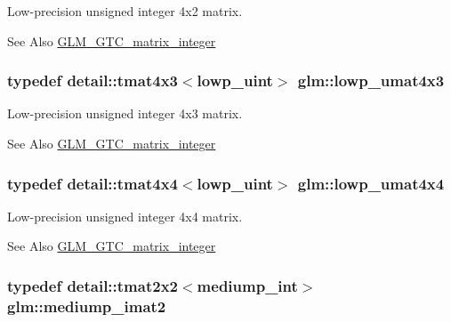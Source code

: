Low-\/precision unsigned integer 4x2 matrix. 

\begin{DoxySeeAlso}{See Also}
\hyperlink{group__gtc__matrix__integer}{G\-L\-M\-\_\-\-G\-T\-C\-\_\-matrix\-\_\-integer} 
\end{DoxySeeAlso}
\hypertarget{group__gtc__matrix__integer_ga37c5f105dd98823c07c39710f57260fe}{
\subsubsection[{lowp\-\_\-umat4x3}]{\setlength{\rightskip}{0pt plus 5cm}typedef detail\-::tmat4x3$<$lowp\-\_\-uint$>$ {\bf glm\-::lowp\-\_\-umat4x3}}}\label{group__gtc__matrix__integer_ga37c5f105dd98823c07c39710f57260fe}


Low-\/precision unsigned integer 4x3 matrix. 

\begin{DoxySeeAlso}{See Also}
\hyperlink{group__gtc__matrix__integer}{G\-L\-M\-\_\-\-G\-T\-C\-\_\-matrix\-\_\-integer} 
\end{DoxySeeAlso}
\hypertarget{group__gtc__matrix__integer_ga38b31bccefd74f6a9e9272cac084df34}{
\subsubsection[{lowp\-\_\-umat4x4}]{\setlength{\rightskip}{0pt plus 5cm}typedef detail\-::tmat4x4$<$lowp\-\_\-uint$>$ {\bf glm\-::lowp\-\_\-umat4x4}}}\label{group__gtc__matrix__integer_ga38b31bccefd74f6a9e9272cac084df34}


Low-\/precision unsigned integer 4x4 matrix. 

\begin{DoxySeeAlso}{See Also}
\hyperlink{group__gtc__matrix__integer}{G\-L\-M\-\_\-\-G\-T\-C\-\_\-matrix\-\_\-integer} 
\end{DoxySeeAlso}
\hypertarget{group__gtc__matrix__integer_ga44c16e631d0b5ab68098131183c7e096}{
\subsubsection[{mediump\-\_\-imat2}]{\setlength{\rightskip}{0pt plus 5cm}typedef detail\-::tmat2x2$<$mediump\-\_\-int$>$ {\bf glm\-::mediump\-\_\-imat2}}}\label{group__gtc__matrix__integer_ga44c16e631d0b5ab68098131183c7e096}


